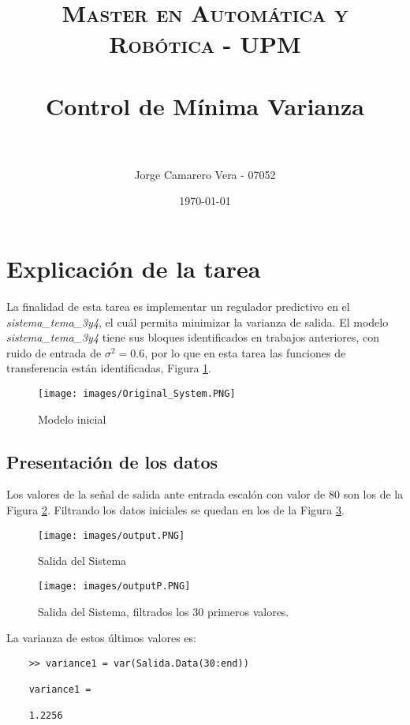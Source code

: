 \documentclass[a4paper, fontsize=11pt]{scrartcl} %
\title{	
	\normalfont \normalsize 
	\textsc{Master en Automática y Robótica - UPM} \\ [25pt] %
	\horrule{0.5pt} \\[0.4cm] %
	\huge Control de Mínima Varianza \\ %
	\horrule{2pt} \\[0.5cm] %
}
\author{Jorge Camarero Vera - 07052} %
\date{\normalsize\today} %
\numberwithin{equation}{section} %
\numberwithin{figure}{section} %
\numberwithin{table}{section} %
\begin{document}
	\maketitle
	
	\section{Explicación de la tarea}
	
	La finalidad de esta tarea es implementar un regulador predictivo en el \textit{sistema\_tema\_3y4}, el cuál permita minimizar la varianza de salida. El modelo \textit{sistema\_tema\_3y4} tiene sus bloques identificados en trabajos anteriores, con ruido de entrada de $\sigma^2 = 0.6$,  por lo que en esta tarea las funciones de transferencia están identificadas, Figura \ref{Modelo Inicial}.\\
	
	\begin{figure}[h!]
		\centering
		\texttt{[image: images/Original\_System.PNG]}
		\caption{Modelo inicial}
		\label{Modelo Inicial}
	\end{figure}
	\FloatBarrier
	
	\subsection{Presentación de los datos}
	
	Los valores de la señal de salida ante entrada escalón con valor de $80$ son los de la Figura \ref{Salida}. Filtrando los datos iniciales se quedan en los de la Figura \ref{SalidaP}.
	
	\begin{figure}[h!]
		\centering
		\texttt{[image: images/output.PNG]}
		\caption{Salida del Sistema}
		\label{Salida}
	\end{figure}
	\FloatBarrier
	
	\begin{figure}[h!]
		\centering
		\texttt{[image: images/outputP.PNG]}
		\caption{Salida del Sistema, filtrados los 30 primeros valores.}
		\label{SalidaP}
	\end{figure}
	\FloatBarrier
	
	La varianza de estos últimos valores es:
	
	\begin{lstlisting}
	>> variance1 = var(Salida.Data(30:end))
	
	variance1 =
	
	1.2256 
	\end{lstlisting}
	
\end{document}

